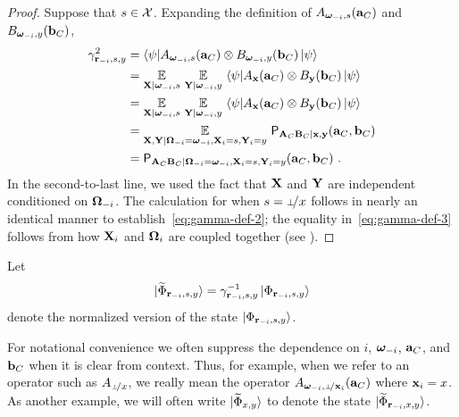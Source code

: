 \begin{proof}
Suppose that $s \in \mathcal{X}$. Expanding the definition of $ A_{{\boldsymbol{\omega}}_{-i},s}(\mathbf{a}_C)$ and $B_{{\boldsymbol{\omega}}_{-i},y}(\mathbf{b}_C)$,
\begin{align*}
	\gamma_{\mathbf{r}_{-i},s,y}^2 &= {\langle\psi|} A_{{\boldsymbol{\omega}}_{-i},s}(\mathbf{a}_C) \otimes B_{{\boldsymbol{\omega}}_{-i},y}(\mathbf{b}_C) \, {|\psi\rangle} \\
	&= \operatorname*{\mathbb{E}}_{\mathbf{X} | {\boldsymbol{\omega}}_{-i}, s} \, \operatorname*{\mathbb{E}}_{\mathbf{Y} | {\boldsymbol{\omega}}_{-i}, y} \, {\langle\psi|} A_{\mathbf{x}}(\mathbf{a}_C) \otimes B_{\mathbf{y}}(\mathbf{b}_C) \, {|\psi\rangle} \\
	&= \operatorname*{\mathbb{E}}_{\mathbf{X} | {\boldsymbol{\omega}}_{-i}, s} \, \operatorname*{\mathbb{E}}_{\mathbf{Y} | {\boldsymbol{\omega}}_{-i}, y} \, {\langle\psi|} A_{\mathbf{x}}(\mathbf{a}_C) \otimes B_{\mathbf{y}}(\mathbf{b}_C) \, {|\psi\rangle} \\
	&= \operatorname*{\mathbb{E}}_{\mathbf{X}, \mathbf{Y} | {\boldsymbol{\Omega}}_{-i} = {\boldsymbol{\omega}}_{-i}, \mathbf{X}_i = s, \mathbf{Y}_i = y} \, \mathsf{P}_{\mathbf{A}_C \mathbf{B}_C | \mathbf{x}, \mathbf{y}}(\mathbf{a}_C,\mathbf{b}_C) \\
	&= \mathsf{P}_{\mathbf{A}_C \mathbf{B}_C | {\boldsymbol{\Omega}}_{-i} = {\boldsymbol{\omega}}_{-i}, \mathbf{X}_i = s,\mathbf{Y}_i = y}(\mathbf{a}_C,\mathbf{b}_C)~.
\end{align*}
In the second-to-last line, we used the fact that $\mathbf{X}$ and $\mathbf{Y}$ are independent conditioned on ${\boldsymbol{\Omega}}_{-i}$. 
The calculation for when $s = \dummyx$ follows in nearly an identical manner to establish~\eqref{eq:gamma-def-2}; the equality in~\eqref{eq:gamma-def-3} follows from how $\mathbf{X}_i$ and ${\boldsymbol{\Omega}}_i$ are coupled together (see ). 
\end{proof}

Let
\begin{equation}\label{eq:def-psitt}
	{|\widetilde{\Phi}_{\mathbf{r}_{-i},s,y}\rangle} = \gamma_{\mathbf{r}_{-i},s,y}^{-1} \, {|\Phi_{\mathbf{r}_{-i},s,y}\rangle}
\end{equation}
denote the normalized version of the state ${|\Phi_{\mathbf{r}_{-i},s,y}\rangle}$.

For notational convenience we often suppress the dependence on $i$, ${\boldsymbol{\omega}}_{-i}$, $\mathbf{a}_C$, and $\mathbf{b}_C$ when it is clear from context. Thus, for example, when we refer to an operator such as $A_\dummyx$, we really mean the operator $A_{\bomega_\mi,\dummy\!/\bx_i}(\ba_C)$ where $\mathbf{x}_i = x$. As another example, we will often write ${|\widetilde{\Phi}_{x,y}\rangle}$ to denote the state ${|\widetilde{\Phi}_{\mathbf{r}_{-i} , x,y}\rangle}$.



%

